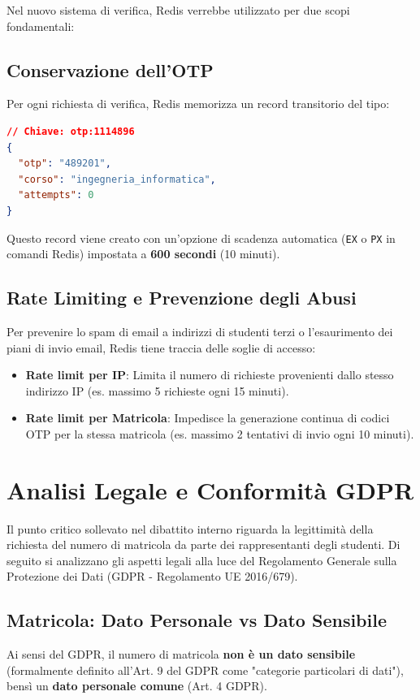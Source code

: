 \documentclass[11pt,a4paper,oneside]{article}
\begin{document}
Nel nuovo sistema di verifica, Redis verrebbe utilizzato per due scopi fondamentali:
\subsection{Conservazione dell'OTP}
Per ogni richiesta di verifica, Redis memorizza un record transitorio del tipo:
\begin{lstlisting}[language=json]
// Chiave: otp:1114896
{
  "otp": "489201",
  "corso": "ingegneria_informatica",
  "attempts": 0
}
\end{lstlisting}
Questo record viene creato con un'opzione di scadenza automatica (\texttt{EX} o \texttt{PX} in comandi Redis) impostata a \textbf{600 secondi} (10 minuti).

\subsection{Rate Limiting e Prevenzione degli Abusi}
Per prevenire lo spam di email a indirizzi di studenti terzi o l'esaurimento dei piani di invio email, Redis tiene traccia delle soglie di accesso:
\begin{itemize}
    \item \textbf{Rate limit per IP}: Limita il numero di richieste provenienti dallo stesso indirizzo IP (es. massimo 5 richieste ogni 15 minuti).
    \item \textbf{Rate limit per Matricola}: Impedisce la generazione continua di codici OTP per la stessa matricola (es. massimo 2 tentativi di invio ogni 10 minuti).
\end{itemize}

\section{Analisi Legale e Conformità GDPR}
Il punto critico sollevato nel dibattito interno riguarda la legittimità della richiesta del numero di matricola da parte dei rappresentanti degli studenti. Di seguito si analizzano gli aspetti legali alla luce del Regolamento Generale sulla Protezione dei Dati (GDPR - Regolamento UE 2016/679).

\subsection{Matricola: Dato Personale vs Dato Sensibile}
\begin{tcolorbox}[colback=red!5!white,colframe=red!75!black,title=Distinzione Legale Fondamentale]
    Ai sensi del GDPR, il numero di matricola \textbf{non è un dato sensibile} (formalmente definito all'Art. 9 del GDPR come "categorie particolari di dati"), bensì un \textbf{dato personale comune} (Art. 4 GDPR).
\end{tcolorbox}
\end{document}
